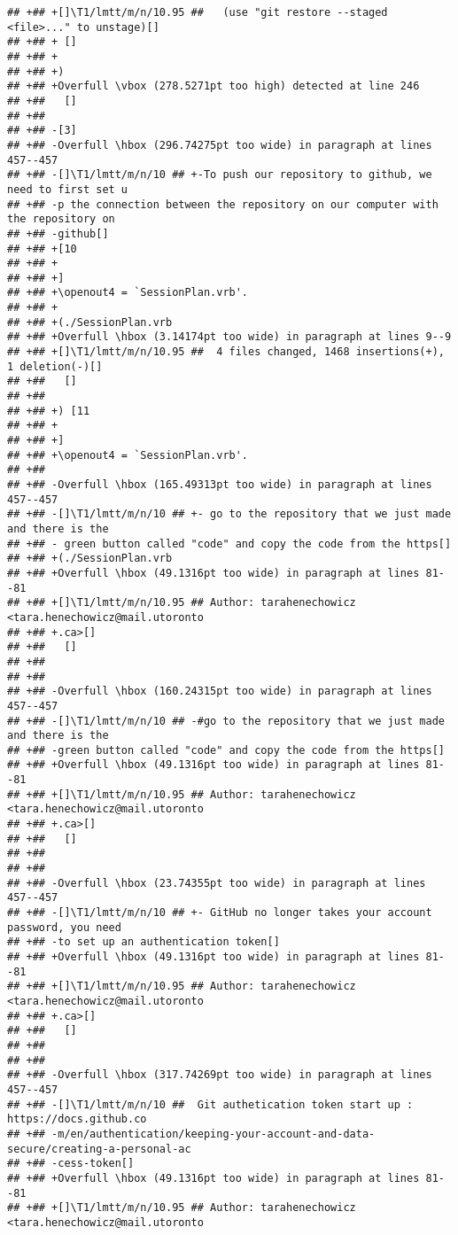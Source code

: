 \documentclass[ignorenonframetext,]{beamer}
\begin{document}
\begin{verbatim}
## +## +[]\T1/lmtt/m/n/10.95 ##   (use "git restore --staged <file>..." to unstage)[] 
## +## + []
## +## +
## +## +)
## +## +Overfull \vbox (278.5271pt too high) detected at line 246
## +##   []
## +##  
## +## -[3]
## +## -Overfull \hbox (296.74275pt too wide) in paragraph at lines 457--457
## +## -[]\T1/lmtt/m/n/10 ## +-To push our repository to github, we need to first set u
## +## -p the connection between the repository on our computer with the repository on 
## +## -github[] 
## +## +[10
## +## +
## +## +]
## +## +\openout4 = `SessionPlan.vrb'.
## +## +
## +## +(./SessionPlan.vrb
## +## +Overfull \hbox (3.14174pt too wide) in paragraph at lines 9--9
## +## +[]\T1/lmtt/m/n/10.95 ##  4 files changed, 1468 insertions(+), 1 deletion(-)[] 
## +##   []
## +##  
## +## +) [11
## +## +
## +## +]
## +## +\openout4 = `SessionPlan.vrb'.
## +##  
## +## -Overfull \hbox (165.49313pt too wide) in paragraph at lines 457--457
## +## -[]\T1/lmtt/m/n/10 ## +- go to the repository that we just made and there is the
## +## - green button called "code" and copy the code from the https[] 
## +## +(./SessionPlan.vrb
## +## +Overfull \hbox (49.1316pt too wide) in paragraph at lines 81--81
## +## +[]\T1/lmtt/m/n/10.95 ## Author: tarahenechowicz <tara.henechowicz@mail.utoronto
## +## +.ca>[] 
## +##   []
## +##  
## +##  
## +## -Overfull \hbox (160.24315pt too wide) in paragraph at lines 457--457
## +## -[]\T1/lmtt/m/n/10 ## -#go to the repository that we just made and there is the 
## +## -green button called "code" and copy the code from the https[] 
## +## +Overfull \hbox (49.1316pt too wide) in paragraph at lines 81--81
## +## +[]\T1/lmtt/m/n/10.95 ## Author: tarahenechowicz <tara.henechowicz@mail.utoronto
## +## +.ca>[] 
## +##   []
## +##  
## +##  
## +## -Overfull \hbox (23.74355pt too wide) in paragraph at lines 457--457
## +## -[]\T1/lmtt/m/n/10 ## +- GitHub no longer takes your account password, you need 
## +## -to set up an authentication token[] 
## +## +Overfull \hbox (49.1316pt too wide) in paragraph at lines 81--81
## +## +[]\T1/lmtt/m/n/10.95 ## Author: tarahenechowicz <tara.henechowicz@mail.utoronto
## +## +.ca>[] 
## +##   []
## +##  
## +##  
## +## -Overfull \hbox (317.74269pt too wide) in paragraph at lines 457--457
## +## -[]\T1/lmtt/m/n/10 ##  Git authetication token start up : https://docs.github.co
## +## -m/en/authentication/keeping-your-account-and-data-secure/creating-a-personal-ac
## +## -cess-token[] 
## +## +Overfull \hbox (49.1316pt too wide) in paragraph at lines 81--81
## +## +[]\T1/lmtt/m/n/10.95 ## Author: tarahenechowicz <tara.henechowicz@mail.utoronto

\end{verbatim}
\end{document}

